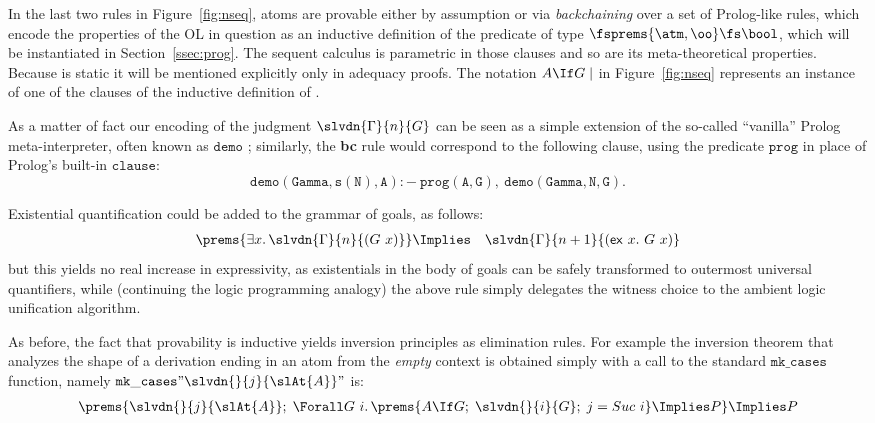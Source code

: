 \documentclass[final]{svjour3}
\begin{document}
In the last two rules in Figure~\ref{fig:nseq}, atoms are provable either by
assumption or via \emph{backchaining} over a set of Prolog-like rules,
which encode the properties of the OL in question as
an inductive definition of the
predicate  of type $\fsprems{\atm, \oo}\fs \bool$, which
will be instantiated in
Section~\ref{ssec:prog}. The sequent calculus is parametric in
those clauses and so are its meta-theoretical
properties.
Because  is static it will be mentioned explicitly only
in adequacy proofs.
The notation $\sbc{A}{G}$ in Figure~\ref{fig:nseq} represents an
instance of one of the clauses of the inductive definition of
.

As a matter of fact our encoding of the judgment
$\slvdn{\Gamma}{n}{G}$ can be seen as a simple extension of the
so-called ``vanilla'' Prolog meta-interpreter, often known as
$\mathtt{demo}$ \cite{Hill&Gallagher1998}; similarly, the \textbf{bc}
rule would correspond to the following clause, using the predicate
$\mathtt{prog}$ in place of Prolog's built-in $\mathtt{clause}$:
$$
\mathtt{demo(Gamma,s(N),A) :-\ prog(A,G),\ demo(Gamma,N,G).}
$$

Existential quantification could be added to the grammar of goals, as follows:
\begin{eqnarray*}
\prems{\exists x.\, \slvdn{\Gamma}{n}{(G\ x)}  } & \Implies &
\slvdn{\Gamma}{n+1}{(\mathsf{ex} \ x.\ G\ x)}
\end{eqnarray*}
but this yields no real increase in expressivity, as existentials in
the body of goals can be safely transformed to outermost universal
quantifiers, while (continuing the logic programming analogy) the
above rule simply delegates the witness choice to the ambient logic
unification algorithm.

As before, the fact that provability is {inductive} yields inversion
principles as elimination rules.  For example the inversion theorem
  that analyzes the shape of a derivation ending in an atom from the
\emph{empty} context is obtained simply with a call to the standard
$\mathtt{mk\_cases}$ function, namely $\mathtt{mk\_cases}
"\slvdn{}{j}{\slAt{A}}"$ is:
\begin{eqnarray*}
  \prems{\slvdn{}{j}{\slAt{A}};\;\Forall G\ i.\, \prems{A\If G;\;
      \slvdn{}{i}{G};\; j = Suc\ i} \Implies P} \Implies P
\end{eqnarray*}
  
\end{document}
